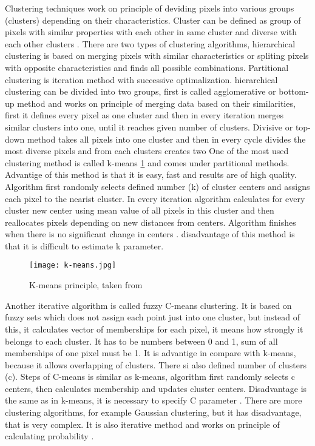         Clustering techniques work on principle of deviding pixels into various groups (clusters) depending on their characteristics. Cluster can be defined as group of pixels
        with similar properties with each other in same cluster and diverse with each other clusters \cite{26}. There are two types of clustering algorithms, hierarchical clustering
        is based on merging pixels with similar characteristics or spliting pixels with opposite characteristics and finds all possible combinations. Partitional clustering
        is iteration method with successive optimalization. hierarchical clustering can be divided into two groups, first is called agglomerative or bottom-up method and
        works on principle of merging data based on their similarities, first it defines every pixel as one cluster and then in every iteration merges similar clusters into one, until
        it reaches given number of clusters. Divisive or top-down method takes all pixels into one cluster and then in every cycle divides the most diverse pixels and from each clusters
        creates two \cite{25, 26} One of the most used clustering method is called k-means \ref{fig:k-means} and comes under partitional methods. Advantige of this method is that it is easy, fast and results are
        of high quality. Algorithm first randomly selects defined number (k) of cluster centers and assigns each pixel to the nearist cluster. In every iteration algorithm
        calculates for every cluster new center using mean value of all pixels in this cluster and then reallocates pixels depending on new distances from centers.
        Algorithm finishes when there is no significant change in centers \cite{26}. disadvantage of this method is that it is difficult to estimate k parameter.

        \begin{figure}[h]
            \texttt{[image: k-means.jpg]}
            \caption{K-means principle, taken from \cite{24}}
            \label{fig:k-means}
        \end{figure}

        Another iterative algorithm is called fuzzy C-means clustering. It is based on fuzzy sets which does not assign each point just into one cluster, but instead of this,
        it calculates vector of memberships for each pixel, it means how strongly it belongs to each cluster. It has to be numbers between 0 and 1, sum of all memberships of one pixel must be 1.
        It is advantige in compare with k-means, because it allows overlapping of clusters. There si also defined number of clusters (c). Steps of C-means is similar as k-means,
        algorithm first randomly selects c centers, then calculates membership and updates cluster centers. Disadvantage is the same as in k-means,
        it is necessary to specify C parameter \cite{26, 27, 28}. There are more clustering algorithms, for example Gaussian clustering, but it has disadvantage, that is very complex.
        It is also iterative method and works on principle of calculating probability \cite{27}.

